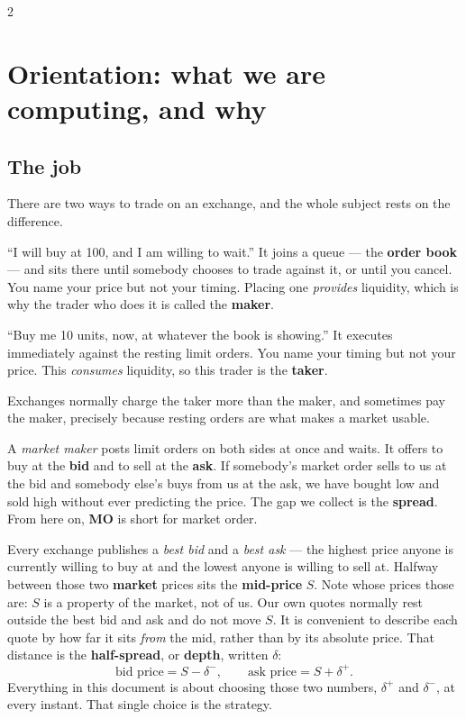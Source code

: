 \documentclass[11pt,a4paper]{article}
\newcommand{\dplus}{\delta^{+}}
\newcommand{\dminus}{\delta^{-}}
\begin{document}
\begingroup\small
\begin{multicols}{2}
\tableofcontents
\end{multicols}
\endgroup
\newpage

\section{Orientation: what we are computing, and why}

\subsection{The job}

There are two ways to trade on an exchange, and the whole subject rests on the
difference.

\begin{description}[leftmargin=2.4cm,style=nextline]
\item[Limit order] ``I will buy at 100, and I am willing to wait.'' It joins a
  queue --- the \textbf{order book} --- and sits there until somebody chooses to
  trade against it, or until you cancel. You name your price but not your
  timing. Placing one \emph{provides} liquidity, which is why the trader who
  does it is called the \textbf{maker}.
\item[Market order] ``Buy me 10 units, now, at whatever the book is showing.''
  It executes immediately against the resting limit orders. You name your timing
  but not your price. This \emph{consumes} liquidity, so this trader is the
  \textbf{taker}.
\end{description}

\noindent Exchanges normally charge the taker more than the maker, and sometimes
pay the maker, precisely because resting orders are what makes a market usable.

A \emph{market maker} posts limit orders on both sides at once and waits. It
offers to buy at the \textbf{bid} and to sell at the \textbf{ask}. If somebody's
market order sells to us at the bid and somebody else's buys from us at the ask,
we have bought low and sold high without ever predicting the price. The gap we
collect is the \textbf{spread}. From here on, \textbf{MO} is short for market
order.

Every exchange publishes a \emph{best bid} and a \emph{best ask} --- the
highest price anyone is currently willing to buy at and the lowest anyone is
willing to sell at. Halfway between those two \textbf{market} prices sits the
\textbf{mid-price} $S$. Note whose prices those are: $S$ is a property of the
market, not of us. Our own quotes normally rest outside the best bid and ask
and do not move $S$. It is convenient
to describe each quote by how far it sits \emph{from} the mid, rather than by its
absolute price. That distance is the \textbf{half-spread}, or \textbf{depth},
written $\delta$:
\[
  \text{bid price} = S - \dminus,
  \qquad
  \text{ask price} = S + \dplus .
\]
Everything in this document is about choosing those two numbers, $\dplus$ and
$\dminus$, at every instant. That single choice is the strategy.
\end{document}
